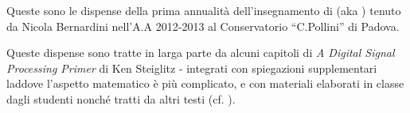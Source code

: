 %
%

Queste sono le dispense della prima annualit\`a dell'insegnamento di \emph{\topic}
(aka \emph{\topicacro}) tenuto da Nicola Bernardini nell'A.A 2012-2013 al
Conservatorio ``C.Pollini'' di Padova.

Queste dispense sono tratte in larga parte da alcuni capitoli di \emph{A Digital Signal Processing Primer}
di Ken Steiglitz\cite{steiglitz:adspp} - integrati
con spiegazioni supplementari laddove l'aspetto matematico \`e pi\`u
complicato, e con materiali elaborati in
classe dagli studenti
nonch\'e tratti da altri testi
(cf. \cite{steiglitz1974introduction, t1987digital, park2010introduction, shenoi2005introduction}).
